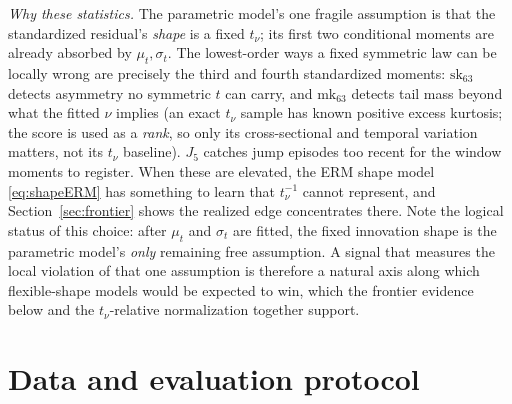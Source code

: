 \documentclass[11pt]{article}
\theoremstyle{remark}
\begin{document}
\emph{Why these statistics.} The parametric model's one fragile
assumption is that the standardized residual's \emph{shape} is a fixed
$t_\nu$; its first two conditional moments are already absorbed by
$\mu_t, \sigma_t$. The lowest-order ways a fixed symmetric law can be
locally wrong are precisely the third and fourth standardized moments:
$\mathrm{sk}_{63}$ detects asymmetry no symmetric $t$ can carry, and
$\mathrm{mk}_{63}$ detects tail mass beyond what the fitted $\nu$
implies (an exact $t_\nu$ sample has known positive excess kurtosis;
the score is used as a \emph{rank}, so only its cross-sectional and
temporal variation matters, not its $t_\nu$ baseline). $J_5$ catches
jump episodes too recent for the window moments to register. When these
are elevated, the ERM shape model \eqref{eq:shapeERM} has something to
learn that $t_\nu^{-1}$ cannot represent, and Section~\ref{sec:frontier} shows the realized edge concentrates there. Note the logical
status of this choice: after $\mu_t$ and $\sigma_t$ are fitted, the
fixed innovation shape is the parametric model's \emph{only} remaining
free assumption. A signal that measures the local violation of that
one assumption is therefore a natural axis along which flexible-shape
models would be expected to win, which the frontier evidence below
and the $t_\nu$-relative normalization together support.

\medskip\noindent{}

\section{Data and evaluation protocol}\label{sec:protocol}
\end{document}
